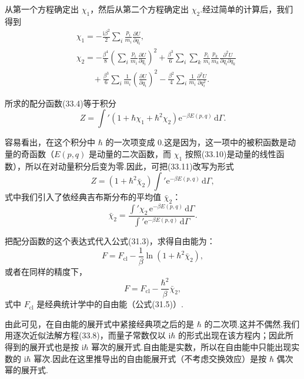 从第一个方程确定出 $\chi_1$，然后从第二个方程确定出 $\chi_2$.经过简单的计算后，我们得到
\begin{equation}
\begin{aligned}
  &\chi_1=-\frac{\mathrm{i}\beta^2}{2}\sum_i\frac{p_i}{m_i}\frac{\partial U}{\partial q_i},\\
  &\chi_2=-\frac{\beta^4}{8}\left(\sum_i\frac{p_i}{m_i}\frac{\partial U}{\partial q_i}\right)^2
  +\frac{\beta^3}{6}\sum_i\sum_k\frac{p_i}{m_i}\frac{p_k}{m_k}
  \frac{\partial^2U}{\partial q_i\partial q_k}\\
  &\qquad+\frac{\beta^3}{6}\sum_i\frac{1}{m_i}\left(\frac{\partial U}{\partial q_i}\right)^2
  -\frac{\beta^2}{4}\sum_i\frac{1}{m_i}\frac{\partial^2U}{\partial q_i^2}.
\end{aligned}
\end{equation}

所求的配分函数(33.4)等于积分
\begin{equation}
  Z=\int'\left(1+\hbar\chi_1+\hbar^2\chi_2\right)\mathrm{e}^{-\beta E(p,q)}\,\mathrm{d}\varGamma.
\end{equation}

容易看出，在这个积分中 $\hbar$ 的一次项变成 0.这是因为，这一项中的被积函数是动量的奇函数（$E(p,q)$ 是动量的二次函数，而 $\chi_1$ 按照(33.10)是动量的线性函数），所以在对动量积分后变为零.因此，可把(33.11)改写为形式
\begin{equation*}
  Z=\left(1+\hbar^2\bar{\chi}_2\right)\int'\mathrm{e}^{-\beta E(p,q)}\,\mathrm{d}\varGamma,
\end{equation*}
式中我们引入了依经典吉布斯分布的平均值 $\bar{\chi}_2$：
\begin{equation*}
  \bar{\chi}_2=\frac{\int'\chi_2\,\mathrm{e}^{-\beta E(p,q)}\,\mathrm{d}\varGamma}
  {\int'\mathrm{e}^{-\beta E(p,q)}\,\mathrm{d}\varGamma}.
\end{equation*}

把配分函数的这个表达式代入公式(31.3)，求得自由能为：
\begin{equation*}
  F=F_{\mathrm{cl}}-\frac{1}{\beta}\ln\left(1+\hbar^2\bar{\chi}_2\right),
\end{equation*}
或者在同样的精度下，
\begin{equation}
  F=F_{\mathrm{cl}}-\frac{\hbar^2}{\beta}\bar{\chi}_2,
\end{equation}
式中 $F_{\mathrm{cl}}$ 是经典统计学中的自由能（公式(31.5)）.

由此可见，在自由能的展开式中紧接经典项之后的是 $\hbar$ 的二次项.这并不偶然.我们用逐次近似法解方程(33.8)，而量子常数仅以 $\mathrm{i}\hbar$ 的形式出现在该方程内；因此所得到的展开式也是按 $\mathrm{i}\hbar$ 幂次的展开式.自由能是实数，所以在自由能中只能出现实数的 $\mathrm{i}\hbar$ 幂次.因此在这里推导出的自由能展开式（不考虑交换效应）是按 $\hbar$ 偶次幂的展开式.

